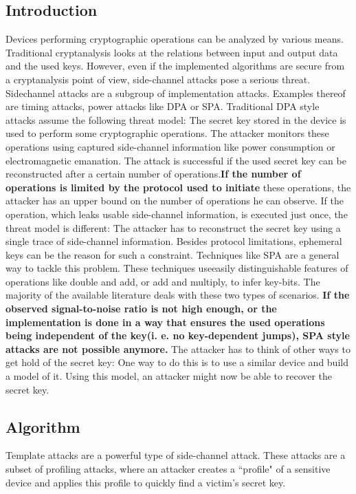 \subsection{Introduction}
    Devices performing cryptographic operations can be analyzed by various
    means. Traditional cryptanalysis looks at the relations between input and
    output data and the used keys. However, even if the implemented algorithms
    are secure from a cryptanalysis point of view, side-channel attacks pose a
    serious threat. Sidechannel attacks are a subgroup of implementation
    attacks. Examples thereof are timing attacks, power attacks like DPA or SPA.
    Traditional DPA style attacks assume the following threat model: The secret
    key stored in the device is used to perform some cryptographic operations.
    The attacker monitors these operations using captured side-channel
    information like power consumption or electromagnetic emanation. The attack
    is successful if the used secret key can be reconstructed after a certain
    number of operations.\textbf{If the number of operations is limited by the
    protocol used to initiate} these operations, the attacker has an upper bound
    on the number of operations he can observe. If the operation, which leaks
    usable side-channel information, is executed just once, the threat model is
    different: The attacker has to reconstruct the secret key using a single
    trace of side-channel information. Besides protocol limitations, ephemeral
    keys can be the reason for such a constraint. Techniques like SPA are a
    general way to tackle this problem. These techniques useeasily
    distinguishable features of operations like double and add, or add and
    multiply, to infer key-bits. The majority of the available literature deals
    with these two types of scenarios. \textbf{If the observed signal-to-noise
    ratio is not high enough, or the implementation is done in a way that
    ensures the used operations being independent of the key(i. e. no
    key-dependent jumps), SPA style attacks are not possible anymore.} The
    attacker has to think of other ways to get hold of the secret key: One way
    to do this is to use a similar device and build a model of it. Using this
    model, an attacker might now be able to recover the secret key.
    
\subsection{Algorithm}
    Template attacks are a powerful type of side-channel attack. These attacks
    are a subset of profiling attacks, where an attacker creates a ``profile" of
    a sensitive device and applies this profile to quickly find a victim's
    secret key.
    
